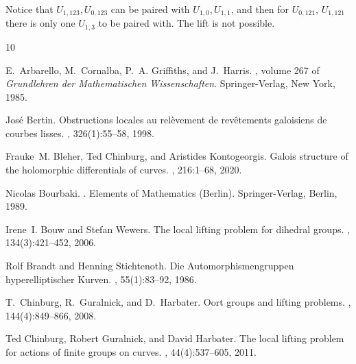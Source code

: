 \documentclass[11pt,letterpaper]{amsart}
\theoremstyle{definition}
\newtheorem{remark}[theorem]{Remark}
\DeclareMathOperator\Gl {GL}
\begin{document}
{Notice that $U_{1,123},U_{0,123}$ can be paired with $U_{1,0},U_{1,1}$, and then for  $U_{0,121}$, $U_{1,121}$ there is only one $U_{1,3}$ to be paired with. The lift is not possible. 






 \def\cprime{$'$}
\begin{thebibliography}{10}

E.~Arbarello, M.~Cornalba, P.~A. Griffiths, and J.~Harris.
, volume 267 of {\em
  Grundlehren der Mathematischen Wissenschaften}.
\newblock Springer-Verlag, New York, 1985.

Jos{\'e} Bertin.
\newblock Obstructions locales au rel\`evement de rev\^etements galoisiens de
  courbes lisses.
, 326(1):55--58, 1998.

Frauke~M. Bleher, Ted Chinburg, and Aristides Kontogeorgis.
\newblock Galois structure of the holomorphic differentials of curves.
, 216:1--68, 2020.

Nicolas Bourbaki.
.
\newblock Elements of Mathematics (Berlin). Springer-Verlag, Berlin, 1989.

Irene~I. Bouw and Stefan Wewers.
\newblock The local lifting problem for dihedral groups.
, 134(3):421--452, 2006.

Rolf Brandt and Henning Stichtenoth.
\newblock Die {A}utomorphismengruppen hyperelliptischer {K}urven.
, 55(1):83--92, 1986.

T.~Chinburg, R.~Guralnick, and D.~Harbater.
\newblock Oort groups and lifting problems.
, 144(4):849--866, 2008.

Ted Chinburg, Robert Guralnick, and David Harbater.
\newblock The local lifting problem for actions of finite groups on curves.
, 44(4):537--605, 2011.


\end{thebibliography}}
\end{document}
